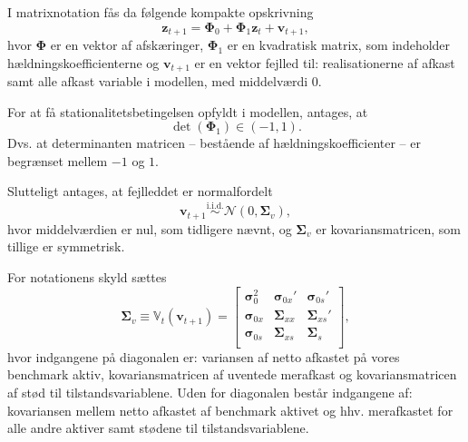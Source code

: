 \documentclass[
  a4paper,
  oneside]{memoir}
\begin{document}
\vspace{5mm}

I matrixnotation fås da følgende kompakte opskrivning
\begin{equation}\label{eq:1}
        \bm{z}_{t+1}=\bm{\Phi}_0+\bm{\Phi}_1\bm{z}_t+\bm{v}_{t+1},
    \end{equation}
hvor \(\bm{\Phi}\) er en vektor af afskæringer, \(\bm{\Phi}_1\) er en kvadratisk matrix, som indeholder hældningskoefficienterne og \(\bm{v}_{t+1}\) er en vektor fejlled til: realisationerne af afkast samt alle afkast variable i modellen, med middelværdi \(0\).

\vspace{5mm}

For at få stationalitetsbetingelsen opfyldt i modellen, antages, at
\begin{equation*}
        \det(\bm{\Phi}_1)\in(-1,1).
    \end{equation*}
Dvs. at determinanten matricen -- bestående af hældningskoefficienter -- er begrænset mellem \(-1\) og \(1\).

\vspace{5mm}

Slutteligt antages, at fejlleddet er normalfordelt
\begin{equation}\label{eq:2}
        \bm{v}_{t+1}\overset{\text{i.i.d.}}{\sim}\mathcal{N}(0,\bm{\Sigma}_v),
    \end{equation}
hvor middelværdien er nul, som tidligere nævnt, og \(\bm{\Sigma}_v\) er kovariansmatricen, som tillige er symmetrisk.

For notationens skyld sættes
\begin{equation*}
        \bm{\Sigma}_v\equiv \mathbb{V}_t(\bm{v}_{t+1})=
        \begin{bmatrix}
        \bm{\sigma}_0^2 & \bm{\sigma}_{0x}' & \bm{\sigma}_{0s}'\\
        \bm{\sigma}_{0x} & \bm{\Sigma}_{xx} & \bm{\Sigma}_{xs}'\\
        \bm{\sigma}_{0s} & \bm{\Sigma}_{xs} & \bm{\Sigma}_{s}\\
        \end{bmatrix},
    \end{equation*}
hvor indgangene på diagonalen er: variansen af netto afkastet på vores benchmark aktiv, kovariansmatricen af uventede merafkast og kovariansmatricen af stød til tilstandsvariablene. Uden for diagonalen består indgangene af: kovariansen mellem netto afkastet af benchmark aktivet og hhv. merafkastet for alle andre aktiver samt stødene til tilstandsvariablene.
\end{document}
